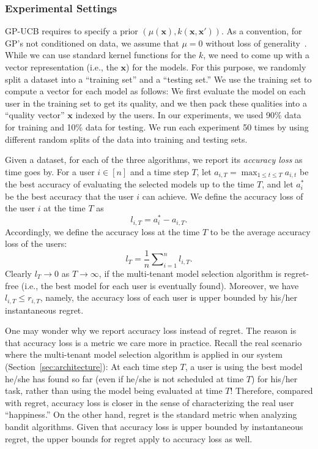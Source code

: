 \documentclass[letterpaper]{vldb}
\begin{document}
\subsubsection{Experimental Settings}

GP-UCB requires to specify a prior $(\mu(\mathbf{x}), k(\mathbf{x},\mathbf{x}'))$.
As a convention, for GP's not conditioned on data, we assume that $\mu=0$ without loss of generality~\cite{SrinivasKKS10}.
While we can use standard kernel functions for the $k$, we need to come up with a vector representation (i.e., the $\mathbf{x}$) for the models.
For this purpose, we randomly split a dataset into a ``training set'' and a ``testing set.''
We use the training set to compute a vector for each model as follows:
We first evaluate the model on each user in the training set to get its quality, and we then pack these qualities into a ``quality vector'' $\mathbf{x}$ indexed by the users.
In our experiments, we used 90\% data for training and 10\% data for testing.
We run each experiment 50 times by using different random splits of the data into training and testing sets.

Given a dataset, for each of the three algorithms, we report its \emph{accuracy loss} as time goes by.
For a user $i\in[n]$ and a time step $T$, let $a_{i,T}=\max_{1\leq t\leq T} a_{i,t}$ be the best accuracy of evaluating the selected models up to the time $T$, and let $a_i^{*}$ be the best accuracy that the user $i$ can achieve.
We define the accuracy loss of the user $i$ at the time $T$ as
\begin{equation}
l_{i,T}=a_i^{*}-a_{i,T}.
\end{equation}
Accordingly, we define the accuracy loss at the time $T$ to be the average accuracy loss of the users:
\begin{equation}\label{eq:accuracy-loss}
l_T=\frac{1}{n}\sum\nolimits_{i=1}^{n}l_{i,T}.
\end{equation}
Clearly $l_T\to 0$ as $T\to\infty$, if the multi-tenant model selection algorithm is regret-free (i.e., the best model for each user is eventually found).
Moreover, we have $l_{i,T}\leq r_{i,T}$, namely, the accuracy loss of each user is upper bounded by his/her instantaneous regret.

One may wonder why we report accuracy loss instead of regret.
The reason is that accuracy loss is a metric we care more in practice.
Recall the real scenario where the multi-tenant model selection algorithm is applied in our system (Section~\ref{sec:architecture}): At each time step $T$, a user is using the best model he/she has found so far (even if he/she is not scheduled at time $T$) for his/her task, rather than using the model being evaluated at time $T$!
Therefore, compared with regret, accuracy loss is closer in the sense of characterizing the real user ``happiness.''
On the other hand, regret is the standard metric when analyzing bandit algorithms.
Given that accuracy loss is upper bounded by instantaneous regret, the upper bounds for regret apply to accuracy loss as well.%
\end{document}
